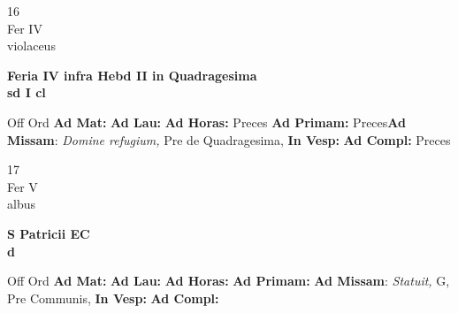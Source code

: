\documentclass[10pt, openany]{book}
\begin{document}
    \begin{center}
        \begin{minipage}{3.5in}
            \vspace{2em}
            \begin{minipage}{0.5in}
                {\Huge 16} \\
                {\normalsize Fer IV} \\
                {\normalsize violaceus}
            \end{minipage}
            \begin{minipage}{3.0in}
                \textbf{ \large Feria IV infra Hebd II in Quadragesima \\
                \textnormal{\normalsize sd I cl}} \\ 
            \end{minipage}
            \begin{justify}Off Ord
                \textbf{Ad Mat: }
                \textbf{Ad Lau: }
                \textbf{Ad Horas: }Preces
                \textbf{Ad Primam: }Preces\textbf{Ad Missam}: \textit{Domine refugium,} Pre de Quadragesima,  
                \textbf{In Vesp: }
                \textbf{Ad Compl: }Preces
            \end{justify}
        \end{minipage}
    \end{center}

    \begin{center}
        \begin{minipage}{3.5in}
            \vspace{2em}
            \begin{minipage}{0.5in}
                {\Huge 17} \\
                {\normalsize Fer V} \\
                {\normalsize albus}
            \end{minipage}
            \begin{minipage}{3.0in}
                \textbf{ \large S Patricii EC \\
                \textnormal{\normalsize d}} \\ 
            \end{minipage}
            \begin{justify}Off Ord
                \textbf{Ad Mat: }
                \textbf{Ad Lau: }
                \textbf{Ad Horas: }
                \textbf{Ad Primam: }\textbf{Ad Missam}: \textit{Statuit,} G, Pre Communis,  
                \textbf{In Vesp: }
                \textbf{Ad Compl: }
            \end{justify}
        \end{minipage}
    \end{center}
\end{document}
